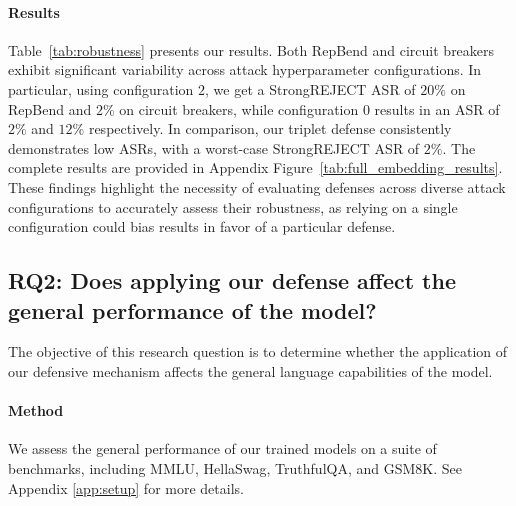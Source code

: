 \documentclass[11pt]{article}
\begin{document}
\paragraph{Results}

Table~\ref{tab:robustness} presents our results.
Both RepBend and circuit breakers exhibit significant variability across attack hyperparameter configurations. In particular, using configuration $2$, we get a StrongREJECT ASR of $20\%$ on RepBend and $2\%$ on circuit breakers, while configuration $0$ results in an ASR of $2\%$ and $12\%$ respectively. In comparison, our triplet defense consistently demonstrates low ASRs, with a worst-case StrongREJECT ASR of $2\%$.
The complete results are provided in Appendix Figure~\ref{tab:full_embedding_results}.
These findings highlight the necessity of evaluating defenses across diverse attack configurations to accurately
assess their robustness, as relying on a single configuration could bias results in favor of a particular defense.

\subsection{RQ2: Does applying our defense affect the general performance of the model?}

The objective of this research question is to determine whether the application of our defensive mechanism affects the general language capabilities of the model.

\paragraph{Method}

We assess the general performance of our trained models on a suite of benchmarks, including MMLU, HellaSwag, TruthfulQA, and GSM8K. See Appendix \ref{app:setup} for more details.
\end{document}
